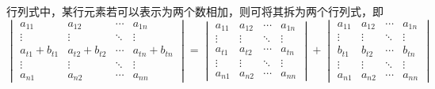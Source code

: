 \begin{property}
    行列式中，某行元素若可以表示为两个数相加，则可将其拆为两个行列式，即
    \[
        \begin{vmatrix}
            a_{11}        & a_{12}        & \cdots & a_{1n}        \\
            \vdots        & \vdots        & \ddots & \vdots        \\
            a_{t1}+b_{t1} & a_{t2}+b_{t2} & \cdots & a_{tn}+b_{tn} \\
            \vdots        & \vdots        & \ddots & \vdots        \\
            a_{n1}        & a_{n2}        & \cdots & a_{nn}
        \end{vmatrix}
        =
        \begin{vmatrix}
            a_{11} & a_{12} & \cdots & a_{1n} \\
            \vdots & \vdots & \ddots & \vdots \\
            a_{t1} & a_{t2} & \cdots & a_{tn} \\
            \vdots & \vdots & \ddots & \vdots \\
            a_{n1} & a_{n2} & \cdots & a_{nn}
        \end{vmatrix}
        +
        \begin{vmatrix}
            a_{11} & a_{12} & \cdots & a_{1n} \\
            \vdots & \vdots & \ddots & \vdots \\
            b_{t1} & b_{t2} & \cdots & b_{tn} \\
            \vdots & \vdots & \ddots & \vdots \\
            a_{n1} & a_{n2} & \cdots & a_{nn}
        \end{vmatrix}
    \]
\end{property}


